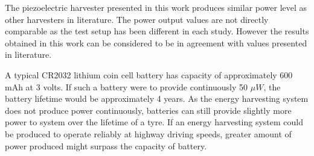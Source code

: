 \begin{table}[htb]
\caption{\label{tbl:results} The designed system compared to current state of the art tyre energy harvester results \cite{Kubba2014}.}
\begin{center}
\end{center}
\end{table}

The piezoelectric harvester presented in this work produces similar power level as other harvesters in literature. The power output values are not directly comparable as the test setup has been different in each study. However the results obtained in this work can be considered to be in agreement with values presented in literature. 

A typical CR2032 lithium coin cell battery has capacity of approximately 600 mAh at 3 volts. If such a battery were to provide continuously 50 $\mu W$, the battery lifetime would be approximately 4 years. As the energy harvesting system does not produce power continuously, batteries can still provide slightly more power to system over the lifetime of a tyre. If an energy harvesting system could be produced to operate reliably at highway driving speeds, greater amount of power produced might surpass the capacity of battery.
